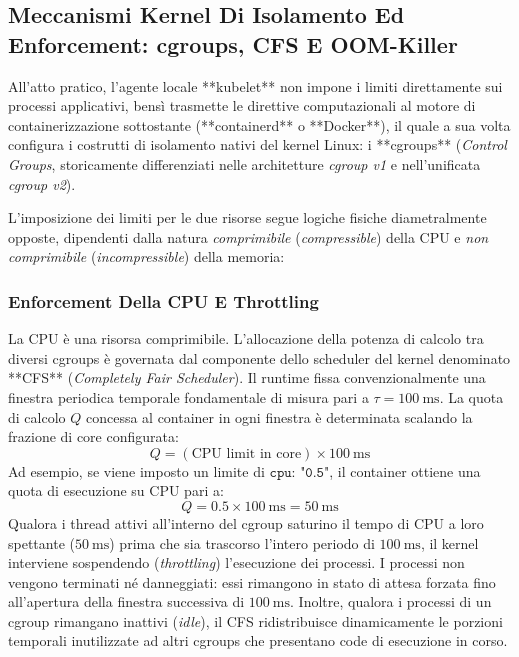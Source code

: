 \documentclass[11pt, a4paper]{article}
\begin{document}
\subsection{Meccanismi Kernel Di Isolamento Ed Enforcement: cgroups, CFS E OOM-Killer}

All'atto pratico, l'agente locale **kubelet** non impone i limiti direttamente sui processi applicativi, bensì trasmette le direttive computazionali al motore di containerizzazione sottostante (**containerd** o **Docker**), il quale a sua volta configura i costrutti di isolamento nativi del kernel Linux: i **cgroups** (\emph{Control Groups}, storicamente differenziati nelle architetture \emph{cgroup v1} e nell'unificata \emph{cgroup v2}).

L'imposizione dei limiti per le due risorse segue logiche fisiche diametralmente opposte, dipendenti dalla natura \emph{comprimibile} (\emph{compressible}) della CPU e \emph{non comprimibile} (\emph{incompressible}) della memoria:

\subsubsection{Enforcement Della CPU E Throttling}
La CPU è una risorsa comprimibile. L'allocazione della potenza di calcolo tra diversi cgroups è governata dal componente dello scheduler del kernel denominato **CFS** (\emph{Completely Fair Scheduler}).
Il runtime fissa convenzionalmente una finestra periodica temporale fondamentale di misura pari a $\tau = \SI{100}{\milli\second}$. La quota di calcolo $Q$ concessa al container in ogni finestra è determinata scalando la frazione di core configurata:
\[
\boxed{Q = (\text{CPU limit in core}) \times \SI{100}{\milli\second}}
\]
Ad esempio, se viene imposto un limite di $\texttt{cpu: "0.5"}$, il container ottiene una quota di esecuzione su CPU pari a:
\[
Q = 0.5 \times \SI{100}{\milli\second} = \SI{50}{\milli\second}
\]
Qualora i thread attivi all'interno del cgroup saturino il tempo di CPU a loro spettante ($\SI{50}{\milli\second}$) prima che sia trascorso l'intero periodo di $\SI{100}{\milli\second}$, il kernel interviene sospendendo (\emph{throttling}) l'esecuzione dei processi. I processi non vengono terminati né danneggiati: essi rimangono in stato di attesa forzata fino all'apertura della finestra successiva di $\SI{100}{\milli\second}$.
Inoltre, qualora i processi di un cgroup rimangano inattivi (\emph{idle}), il CFS ridistribuisce dinamicamente le porzioni temporali inutilizzate ad altri cgroups che presentano code di esecuzione in corso.
\end{document}
